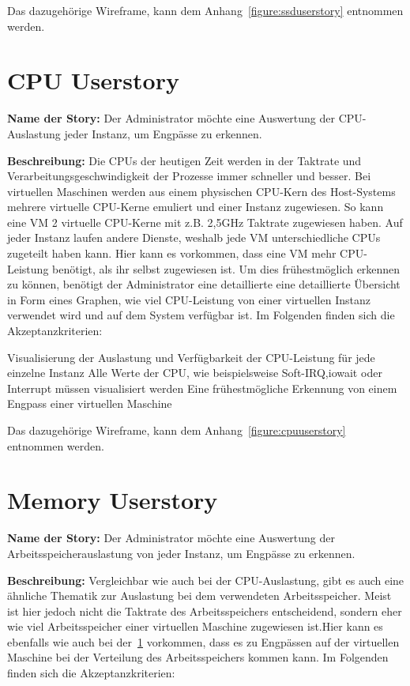 {Das dazugehörige Wireframe, kann dem Anhang~\ref{figure:ssduserstory} entnommen
werden.
\mr%

\section{CPU Userstory}
\label{section:CPU_Userstory}
\textbf{Name der Story:} Der Administrator möchte eine Auswertung der
CPU\hyp{}Auslastung jeder Instanz, um Engpässe zu erkennen.

\textbf{Beschreibung:} Die CPUs der heutigen Zeit werden in der Taktrate und
Verarbeitungsgeschwindigkeit der Prozesse immer schneller und besser. Bei
virtuellen Maschinen werden aus einem physischen CPU\hyp{}Kern des Host-Systems
mehrere virtuelle CPU-Kerne emuliert und einer Instanz zugewiesen. So kann eine
VM 2 virtuelle CPU-Kerne mit z.B. 2,5\si{\giga\hertz} Taktrate zugewiesen
haben. Auf jeder Instanz laufen andere Dienste, weshalb jede VM
unterschiedliche CPUs zugeteilt haben kann. Hier kann es vorkommen, dass eine
VM mehr CPU-Leistung benötigt, als ihr selbst zugewiesen ist. Um dies
frühestmöglich erkennen zu können, benötigt der Administrator eine detaillierte
eine detaillierte Übersicht in Form eines Graphen, wie viel CPU\hyp{}Leistung
von einer virtuellen Instanz verwendet wird und auf dem System verfügbar ist.
Im Folgenden finden sich die Akzeptanzkriterien:

\begin{outline}
  \1 Visualisierung der Auslastung und Verfügbarkeit der CPU\hyp{}Leistung für
  jede einzelne Instanz
  \1 Alle Werte der CPU, wie beispielsweise \gls{Soft-IRQ},\gls{iowait} oder
  \gls{Interrupt} müssen visualisiert werden
  \1 Eine frühestmögliche Erkennung von einem Engpass einer virtuellen Maschine
\end{outline}

Das dazugehörige Wireframe, kann dem Anhang~\ref{figure:cpuuserstory} entnommen
werden.
\mr%

\section{Memory Userstory}
\textbf{Name der Story:} Der Administrator möchte eine Auswertung der
Arbeitsspeicherauslastung von jeder Instanz, um Engpässe zu erkennen.

\textbf{Beschreibung:} Vergleichbar wie auch bei der CPU\hyp{}Auslastung, gibt
es auch eine ähnliche Thematik zur Auslastung bei dem verwendeten
Arbeitsspeicher.  Meist ist hier jedoch nicht die Taktrate des Arbeitsspeichers
entscheidend, sondern eher wie viel Arbeitsspeicher einer virtuellen Maschine
zugewiesen ist.Hier kann es ebenfalls wie auch bei der~\ref{section:CPU_Userstory}
vorkommen, dass es zu Engpässen auf der virtuellen Maschine bei der Verteilung
des Arbeitsspeichers kommen kann. Im Folgenden finden sich die
Akzeptanzkriterien:

}

